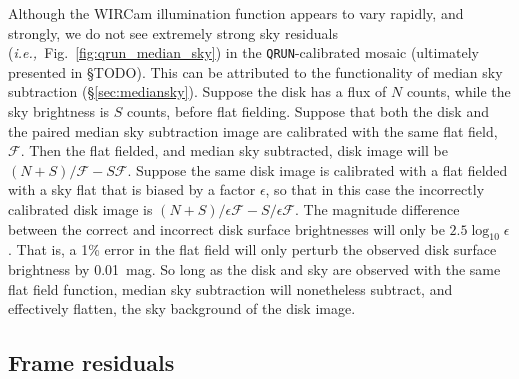 \documentclass[iop]{emulateapj}
\newcommand{\ie}{\textit{i.e.,~}}
\newcommand{\todo}[1]{\textcolor{BurntOrange}{\textsf{#1}}} %
\newcommand{\Fig}[1]{Fig.~\ref{fig:#1}}  %
\newcommand{\Sec}[1]{\S\ref{sec:#1}}  %
\begin{document}
Although the WIRCam illumination function appears to vary rapidly, and strongly, we do not see extremely strong sky residuals (\ie \Fig{qrun_median_sky}) in the \texttt{QRUN}-calibrated mosaic (ultimately presented in \todo{\S TODO}).
This can be attributed to the functionality of median sky subtraction (\Sec{mediansky}).
Suppose the disk has a flux of $N$ counts, while the sky brightness is $S$ counts, before flat fielding.
Suppose that both the disk and the paired median sky subtraction image are calibrated with the same flat field, $\mathcal{F}$.
Then the flat fielded, and median sky subtracted, disk image will be $(N + S)/\mathcal{F} - S \mathcal{F}$.
Suppose the same disk image is calibrated with a flat fielded with a sky flat that is biased by a factor $\epsilon$, so that in this case the incorrectly calibrated disk image is $(N + S) / \epsilon \mathcal{F} - S / \epsilon \mathcal{F}$.
The magnitude difference between the correct and incorrect disk surface brightnesses will only be $2.5 \log_{10} \epsilon$.
That is, a 1\% error in the flat field will only perturb the observed disk surface brightness by 0.01~mag.
So long as the disk and sky are observed with the same flat field function, median sky subtraction will nonetheless subtract, and effectively flatten, the sky background of the disk image.

\subsection{Frame residuals} %
\label{sec:frameresiduals}
\end{document}
